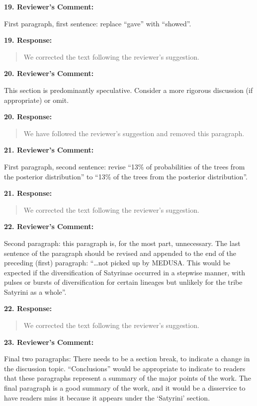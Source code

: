 \documentclass[]{article}
\begin{document}
\textbf{19. Reviewer's Comment:}

First paragraph, first sentence: replace ``gave'' with ``showed''.

\textbf{19. Response:}

\begin{quote}
\color{blue}
We corrected the text following the reviewer's suggestion.
\end{quote}

\textbf{20. Reviewer's Comment:}

This section is predominantly speculative. Consider a more rigorous
discussion (if appropriate) or omit.

\textbf{20. Response:}

\begin{quote}
\color{blue}
We have followed the reviewer's suggestion and removed this paragraph.
\end{quote}

\textbf{21. Reviewer's Comment:}

First paragraph, second sentence: revise ``13\% of probabilities of the
trees from the posterior distribution'' to ``13\% of the trees from the
posterior distribution''.

\textbf{21. Response:}

\begin{quote}
\color{blue}
We corrected the text following the reviewer's suggestion.
\end{quote}

\textbf{22. Reviewer's Comment:}

Second paragraph: this paragraph is, for the most part, unnecessary. The
last sentence of the paragraph should be revised and appended to the end
of the preceding (first) paragraph: ``\ldots{}not picked up by MEDUSA.
This would be expected if the diversification of Satyrinae occurred in a
stepwise manner, with pulses or bursts of diversification for certain
lineages but unlikely for the tribe Satyrini as a whole''.

\textbf{22. Response:}

\begin{quote}
\color{blue}
We corrected the text following the reviewer's suggestion.
\end{quote}

\textbf{23. Reviewer's Comment:}

Final two paragraphs: There needs to be a section break, to indicate a
change in the discussion topic. ``Conclusions'' would be appropriate to
indicate to readers that these paragraphs represent a summary of the
major points of the work. The final paragraph is a good summary of the
work, and it would be a disservice to have readers miss it because it
appears under the `Satyrini' section.
\end{document}
